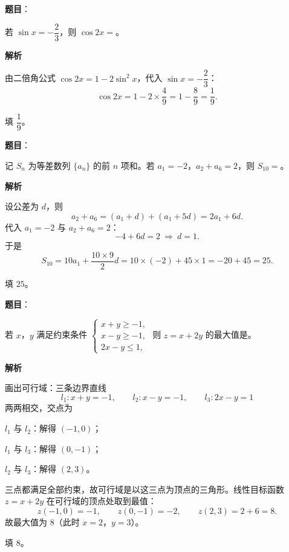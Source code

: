 \begin{answer}

\textbf{题目}：

若 $\sin x=-\dfrac23$，则 $\cos2x=$\gkblank{}。

\textbf{解析}

由二倍角公式 $\cos2x=1-2\sin^2x$，代入 $\sin x=-\dfrac23$：
\nopagebreak[4]
\[\cos2x=1-2\times\frac49=1-\frac89=\frac19 .\]

填 $\dfrac19$。


\end{answer}
\begin{answer}

\textbf{题目}：

记 $S_n$ 为等差数列 $\{a_n\}$ 的前 $n$ 项和。若 $a_1=-2$，$a_2+a_6=2$，则 $S_{10}=$\gkblank{}。

\textbf{解析}

设公差为 $d$，则
\nopagebreak[4]
\[a_2+a_6=(a_1+d)+(a_1+5d)=2a_1+6d .\]
代入 $a_1=-2$ 与 $a_2+a_6=2$：
\nopagebreak[4]
\[-4+6d=2\ \Longrightarrow\ d=1 .\]
于是
\nopagebreak[4]
\[S_{10}=10a_1+\frac{10\times9}2d=10\times(-2)+45\times1=-20+45=25 .\]

填 $25$。


\end{answer}
\begin{answer}

\textbf{题目}：

若 $x$，$y$ 满足约束条件 $\begin{cases}x+y\geqslant-1,\\x-y\geqslant-1,\\2x-y\leqslant1,\end{cases}$ 则 $z=x+2y$ 的最大值是\gkblank{}。

\textbf{解析}

画出可行域：三条边界直线
\nopagebreak[4]
\[l_1:x+y=-1,\qquad l_2:x-y=-1,\qquad l_3:2x-y=1\]
两两相交，交点为

$l_1$ 与 $l_2$：解得 $(-1,0)$；

$l_1$ 与 $l_3$：解得 $(0,-1)$；

$l_2$ 与 $l_3$：解得 $(2,3)$。

三点都满足全部约束，故可行域是以这三点为顶点的三角形。线性目标函数 $z=x+2y$ 在可行域的顶点处取到最值：
\nopagebreak[4]
\[z(-1,0)=-1,\qquad z(0,-1)=-2,\qquad z(2,3)=2+6=8 .\]
故最大值为 $8$（此时 $x=2$，$y=3$）。

填 $8$。


\end{answer}
